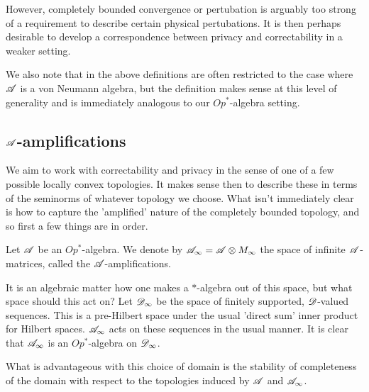 \documentclass[../main.tex]{subfiles}
\begin{document}
However, completely bounded convergence or pertubation is arguably too strong of a 
requirement to describe certain physical pertubations. It is then perhaps desirable to 
develop a correspondence between privacy and correctability in a weaker setting.

We also note that in the above definitions are often restricted to the case where 
$\mathscr{A}$ is a von Neumann algebra, but the definition makes sense at this level of 
generality and is immediately analogous to our $Op^*$-algebra setting.

\subsection{$\mathscr{A}$-amplifications}

We aim to work with correctability and privacy in the sense of one of a few possible 
locally convex topologies. It makes sense then to describe these in terms of the 
seminorms of whatever topology we choose. What isn't immediately clear is how to capture
the 'amplified' nature of the completely bounded topology, and so first a few things are
in order.

\begin{definition}

Let $\mathscr{A}$ be an $Op^*$-algebra. We denote by $\mathscr{A}_\infty = \mathscr{A} \otimes M_\infty$ 
the space of infinite $\mathscr{A}$-matrices, called the $\mathscr{A}$-amplifications.

\end{definition}

It is an algebraic matter how one makes a $\ast$-algebra out of this space, but
what space should this act on? Let $\mathscr{D}_\infty$ be the space of 
finitely supported, $\mathscr{D}$-valued sequences. This is a pre-Hilbert space under the 
usual 'direct sum' inner product for Hilbert spaces. $\mathscr{A}_\infty$ acts on 
these sequences in the usual manner. 
It is clear that $\mathscr{A}_\infty$ is an $Op^*$-algebra on $\mathscr{D}_\infty$.

What is advantageous with this choice of domain is the stability of completeness of the 
domain with respect to the topologies induced by $\mathscr{A}$ and $\mathscr{A}_\infty$.
\end{document}
